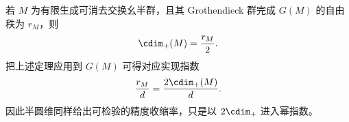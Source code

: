 \begin{remark}[半圆维口径下的同一指数]\label{rem:xi-cdim-plus-phase-precision-index}
若 \(M\) 为有限生成可消去交换幺半群，且其 Grothendieck 群完成 \(G(M)\) 的自由秩为 \(r_M\)，则
\[
\cdim_{+}(M)=\frac{r_M}{2}.
\]
把上述定理应用到 \(G(M)\) 可得对应实现指数
\[
\frac{r_M}{d}=\frac{2\cdim_{+}(M)}{d}.
\]
因此半圆维同样给出可检验的精度收缩率，只是以 \(2\cdim_{+}\) 进入幂指数。
\end{remark}

\endinput

